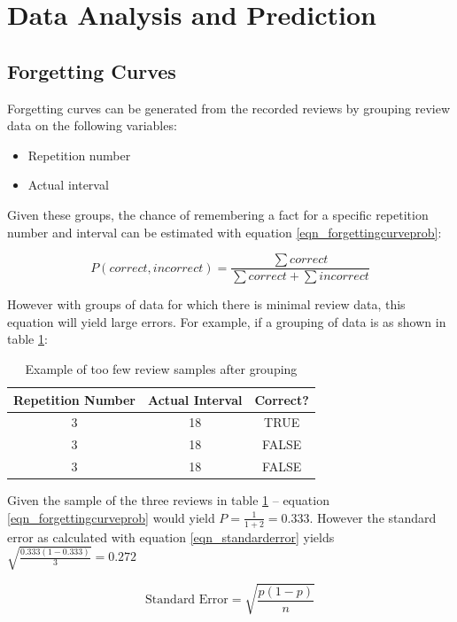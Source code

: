 \section{Data Analysis and Prediction}
\subsection{Forgetting Curves}

Forgetting curves can be generated from the recorded reviews by grouping review data on the following
variables:
\begin{itemize}
  \item Repetition number
  \item Actual interval
\end{itemize}

Given these groups, the chance of remembering a fact for a specific repetition number and interval 
can be estimated with equation \ref{eqn_forgettingcurveprob}:

\begin{equation}
\label{eqn_forgettingcurveprob}
P(correct,incorrect) = \frac{\sum correct}{\sum correct + \sum incorrect}
\end{equation}

However with groups of data for which there is minimal review data, this equation will yield
large errors. For example, if a grouping of data is as shown in table \ref{tbl_forgettingcurvegrouping}:

\begin{table}[h!]
\caption{Example of too few review samples after grouping}
\label{tbl_forgettingcurvegrouping}
\begin{tabular}{|c|c||c|}
\hline
Repetition Number & Actual Interval & Correct?\\
\hline
3 & 18 & TRUE\\
3 & 18 & FALSE\\
3 & 18 & FALSE\\
\hline
\end{tabular}
\end{table}

Given the sample of the three reviews in table \ref{tbl_forgettingcurvegrouping}
-- equation \ref{eqn_forgettingcurveprob} would yield $P = \frac{1}{1+2} = 0.333$.
However the standard error as calculated with equation \ref{eqn_standarderror} yields
$\sqrt{\frac{0.333(1 - 0.333)}{3}} = 0.272$

\begin{equation}
\label{eqn_standarderror}
\text{Standard Error} = \sqrt{\frac{p(1-p)}{n}}
\end{equation}

